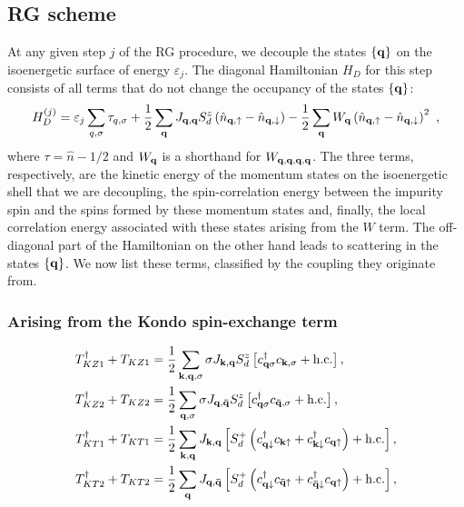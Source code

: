 \documentclass[reprint,hidelinks]{revtex4-2}
\begin{document}
\begin{widetext}
\subsection{RG scheme}
At any given step \(j\) of the RG procedure, we decouple the states \(\left\{ {\bf q} \right\} \) on the isoenergetic surface of energy \(\varepsilon_j\). The diagonal Hamiltonian \(H_D\) for this step consists of all terms that do not change the occupancy of the states \(\left\{{\bf q}\right\}\):
\begin{equation}\begin{aligned}
	H_D^{(j)} = \varepsilon_j\sum_{q,\sigma}\tau_{q,\sigma} + \frac{1}{2}\sum_{{\bf q}}J_{{\bf q}, {\bf q}}S_d^z\left(\hat n_{{\bf q}, \uparrow} - \hat n_{{\bf q}, \downarrow}\right) - \frac{1}{2}\sum_{{\bf q}}W_{\bf q}\left(\hat n_{{\bf q}, \uparrow} - \hat n_{{\bf q}, \downarrow}\right)^2~,
\end{aligned}\end{equation}
where \(\tau = \hat n - 1/2\) and \(W_{{\bf q}}\) is a shorthand for \(W_{{\bf q},{\bf q},{\bf q},{\bf q}}\). The three terms, respectively, are the kinetic energy of the momentum states on the isoenergetic shell that we are decoupling, the spin-correlation energy between the impurity spin and the spins formed by these momentum states and, finally, the local correlation energy associated with these states arising from the \(W\) term. The off-diagonal part of the Hamiltonian on the other hand leads to scattering in the states \(\left\{ {\bf q} \right\} \). We now list these terms, classified by the coupling they originate from.

\subsubsection*{Arising from the Kondo spin-exchange term}
\begin{equation}\begin{aligned}
	T_{KZ1}^\dagger + T_{KZ1} &= \frac{1}{2}\sum_{{\bf k}, {\bf q}, \sigma}\sigma J_{{\bf k}, {\bf q}} S_d^z  \left[c^\dagger_{{\bf q}\sigma}c_{{\bf k},\sigma} + \text{h.c.}\right],\\
	T_{KZ2}^\dagger + T_{KZ2} &= \frac{1}{2}\sum_{{\bf q}, \sigma}\sigma J_{{\bf q}, {\bf \bar q}} S_d^z  \left[c^\dagger_{{\bf q}\sigma}c_{{\bf \bar q},\sigma} + \text{h.c.}\right],\\
	T_{KT1}^\dagger + T_{KT1} &= \frac{1}{2}\sum_{{\bf k}, {\bf q}}J_{{\bf k}, {\bf q}} \left[S_d^+\left(c^\dagger_{{\bf q}\downarrow}c_{{\bf k}\uparrow} + c^\dagger_{{\bf k}\downarrow}c_{{\bf q}\uparrow}\right) + \text{h.c.}\right],\\
	T_{KT2}^\dagger + T_{KT2} &= \frac{1}{2}\sum_{{\bf q}}J_{{\bf q}, {\bf \bar q}} \left[S_d^+\left(c^\dagger_{{\bf q}\downarrow}c_{{\bf \bar q}\uparrow} + c^\dagger_{{\bf \bar q}\downarrow}c_{{\bf q}\uparrow}\right) + \text{h.c.}\right],\\
\end{aligned}\end{equation}

\end{widetext}
\end{document}
